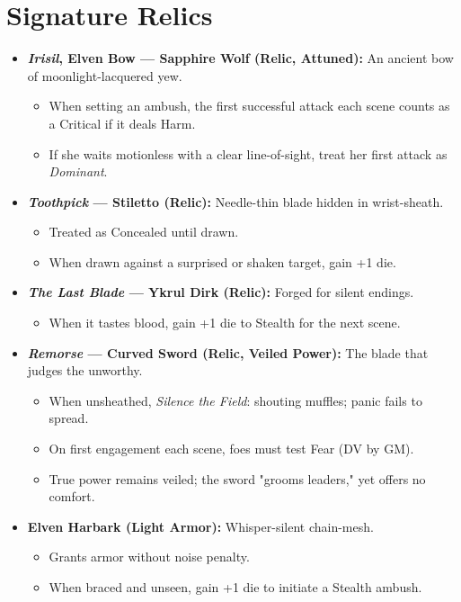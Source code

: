 \documentclass[11pt]{article}
\begin{document}
\section*{Signature Relics}
\begin{itemize}
  \item \textbf{\emph{Irisil}, Elven Bow --- Sapphire Wolf (Relic, Attuned):}  
  An ancient bow of moonlight-lacquered yew.  
  \begin{itemize}
    \item When setting an ambush, the first successful attack each scene counts as a Critical if it deals Harm.
    \item If she waits motionless with a clear line-of-sight, treat her first attack as \emph{Dominant}.
  \end{itemize}

  \item \textbf{\emph{Toothpick} --- Stiletto (Relic):}  
  Needle-thin blade hidden in wrist-sheath.  
  \begin{itemize}
    \item Treated as Concealed until drawn.
    \item When drawn against a surprised or shaken target, gain +1 die.
  \end{itemize}

  \item \textbf{\emph{The Last Blade} --- Ykrul Dirk (Relic):}  
  Forged for silent endings.  
  \begin{itemize}
    \item When it tastes blood, gain +1 die to Stealth for the next scene.
  \end{itemize}

  \item \textbf{\emph{Remorse} --- Curved Sword (Relic, Veiled Power):}  
  The blade that judges the unworthy.  
  \begin{itemize}
    \item When unsheathed, \emph{Silence the Field}: shouting muffles; panic fails to spread.
    \item On first engagement each scene, foes must test Fear (DV by GM).
    \item True power remains veiled; the sword "grooms leaders," yet offers no comfort.
  \end{itemize}

  \item \textbf{Elven Harbark (Light Armor):}  
  Whisper-silent chain-mesh.  
  \begin{itemize}
    \item Grants armor without noise penalty.
    \item When braced and unseen, gain +1 die to initiate a Stealth ambush.
  \end{itemize}
\end{itemize}
\end{document}
